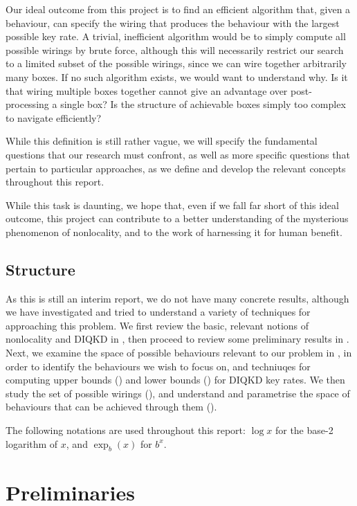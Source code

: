 \documentclass[10pt, a4paper]{article}
\numberwithin{equation}{section} %
\theoremstyle{definition}
\theoremstyle{plain}
\newcommand{\?}{\mathrel{?}} %
\begin{document}
  Our ideal outcome from this project is to find an efficient algorithm that, given a behaviour, can specify the wiring that produces the behaviour with the largest possible key rate. A trivial, inefficient algorithm would be to simply compute all possible wirings by brute force, although this will necessarily restrict our search to a limited subset of the possible wirings, since we can wire together arbitrarily many boxes. If no such algorithm exists, we would want to understand why. Is it that wiring multiple boxes together cannot give an advantage over post-processing a single box? Is the structure of achievable boxes simply too complex to navigate efficiently?

  While this definition is still rather vague, we will specify the fundamental questions that our research must confront, as well as more specific questions that pertain to particular approaches, as we define and develop the relevant concepts throughout this report.

  While this task is daunting, we hope that, even if we fall far short of this ideal outcome, this project can contribute to a better understanding of the mysterious phenomenon of nonlocality, and to the work of harnessing it for human benefit.

  \subsection{Structure}

  As this is still an interim report, we do not have many concrete results, although we have investigated and tried to understand a variety of techniques for approaching this problem. We first review the basic, relevant notions of nonlocality and DIQKD in , then proceed to review some preliminary results in . Next, we examine the space of possible behaviours relevant to our problem in , in order to identify the behaviours we wish to focus on, and techniuqes for computing upper bounds () and lower bounds () for DIQKD key rates. We then study the set of possible wirings (),  and understand and parametrise the space of behaviours that can be achieved through them ().

  The following notations are used throughout this report: \(\log x\) for the base-2 logarithm of \(x\), and \(\exp_b(x)\) for \(b^x\).

  \section{Preliminaries}\label{sec:pre}
\end{document}
